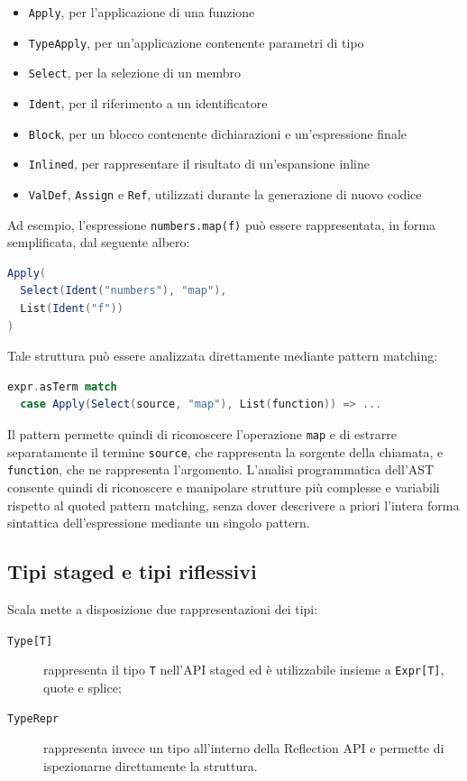 \documentclass[a4paper,11pt]{report}
\theoremstyle{definition}
\begin{document}
\begin{itemize}
  \item \texttt{Apply}, per l'applicazione di una funzione
  \item \texttt{TypeApply}, per un'applicazione contenente parametri di tipo
  \item \texttt{Select}, per la selezione di un membro
  \item \texttt{Ident}, per il riferimento a un identificatore
  \item \texttt{Block}, per un blocco contenente dichiarazioni e un'espressione finale
  \item \texttt{Inlined}, per rappresentare il risultato di un'espansione inline
  \item \texttt{ValDef}, \texttt{Assign} e \texttt{Ref}, utilizzati durante la generazione di nuovo codice
\end{itemize}

Ad esempio, l'espressione \verb|numbers.map(f)| può essere rappresentata, in forma semplificata, dal seguente albero:

\begin{lstlisting}[language=Scala]
Apply(
  Select(Ident("numbers"), "map"),
  List(Ident("f"))
)
\end{lstlisting}

Tale struttura può essere analizzata direttamente mediante pattern matching:

\begin{lstlisting}[language=Scala]
expr.asTerm match
  case Apply(Select(source, "map"), List(function)) => ...
\end{lstlisting}

Il pattern permette quindi di riconoscere l'operazione \texttt{map} e di estrarre separatamente il termine \texttt{source}, che rappresenta la sorgente della chiamata, e \texttt{function}, che ne rappresenta l'argomento. L'analisi programmatica dell'AST consente quindi di riconoscere e manipolare strutture più complesse e variabili rispetto al quoted pattern matching, senza dover descrivere a priori l'intera forma sintattica dell'espressione mediante un singolo pattern.
\subsection{Tipi staged e tipi riflessivi}
\label{sec:types}

Scala mette a disposizione due rappresentazioni dei tipi:

\begin{description}
  \item[\texttt{Type[T]}] rappresenta il tipo \texttt{T} nell'API staged ed è utilizzabile insieme a \texttt{Expr[T]}, quote e splice;
  \item[\texttt{TypeRepr}] rappresenta invece un tipo all'interno della Reflection API e permette di ispezionarne direttamente la struttura.
\end{description}
\end{document}
